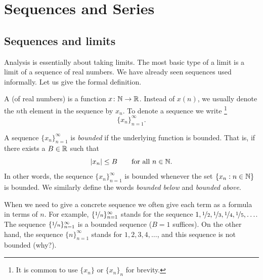 \chapter{Sequences and Series} \label{seq:chapter}


\section{Sequences and limits}
\label{sec:seqsandlims}


Analysis is essentially about taking limits.  The most basic type of a limit
is a limit of a sequence of real numbers.
We have already seen sequences used informally.  Let us give the formal
definition.

\begin{defn}
A \emph{} (of real numbers) is a function $x \colon {\mathbb{N}} \to
{\mathbb{R}}$.  Instead of $x(n)$, we 
usually denote the $n$th element in the sequence by $x_n$.
To denote a sequence we write%
\footnote{It is common to use $\{ x_n \}$ or $\{ x_n \}_n$ for brevity.}%
%
\begin{equation*}
\{ x_n \}_{n=1}^\infty.
\end{equation*}

A sequence $\{ x_n \}_{n=1}^\infty$ is \emph{bounded} if
the underlying function is bounded.  That is, if
there exists a $B \in {\mathbb{R}}$ such that
\begin{equation*}
\left\lvert {x_n} \right\rvert \leq B \qquad \text{for all } n \in {\mathbb{N}}.
\end{equation*}
In other words, the sequence $\{x_n\}_{n=1}^\infty$ is bounded whenever
the set $\{ x_n : n \in {\mathbb{N}} \}$
is bounded.
We similarly define the words
\emph{bounded below} and
\emph{bounded above}.
\end{defn}

When we need
to give a concrete sequence we often give each term as a formula in
terms of $n$.
For example, $\{ \nicefrac{1}{n} \}_{n=1}^\infty$ stands for
the sequence $1, \nicefrac{1}{2}, \nicefrac{1}{3}, \nicefrac{1}{4},
\nicefrac{1}{5}, \ldots$.
The sequence $\{ \nicefrac{1}{n} \}_{n=1}^\infty$
is a bounded sequence ($B=1$ suffices).  On the other hand, the sequence
$\{ n \}_{n=1}^\infty$ stands for
$1,2,3,4,\ldots$, and this sequence is not bounded (why?).

